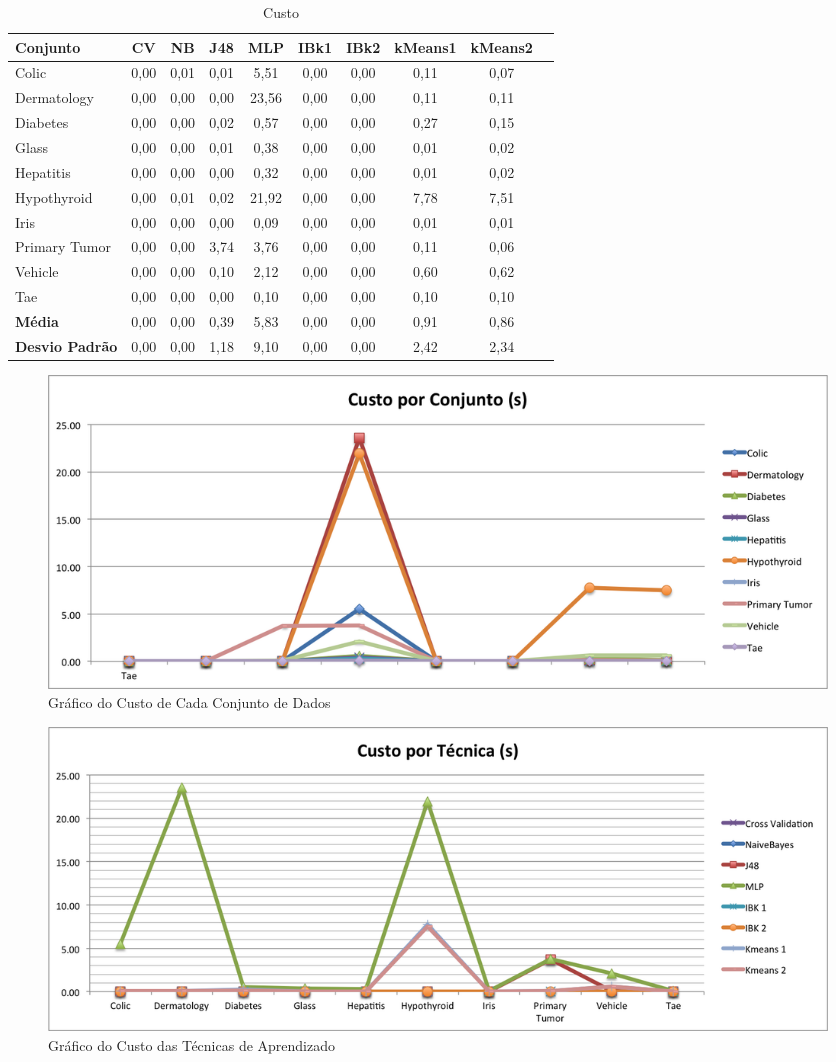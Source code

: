 \documentclass[12pt]{article}
\begin{document}
\begin{table}[h]
	\centering
	\caption{Custo }
	\label{tabelaCustoConjuntoDados}
	\begin{tabular}{lccccccccc}
		\hline
		Conjunto & CV & NB & J48 & MLP & IBk1 & IBk2 & kMeans1 & kMeans2 \\ \hline
		Colic  & 0,00 & 0,01 & 0,01 & 5,51 & 0,00 & 0,00 & 0,11 & 0,07 \\ \hline
		Dermatology & 0,00 & 0,00 & 0,00 & 23,56 & 0,00 & 0,00 & 0,11 & 0,11 \\ \hline
		Diabetes & 0,00 & 0,00 & 0,02 & 0,57 & 0,00 & 0,00 & 0,27 & 0,15 \\ \hline
		Glass & 0,00 & 0,00 & 0,01 & 0,38 & 0,00 & 0,00 & 0,01 & 0,02 \\ \hline
		Hepatitis & 0,00 & 0,00 & 0,00 & 0,32 & 0,00 & 0,00 & 0,01 & 0,02 \\ \hline
		Hypothyroid  & 0,00 & 0,01 & 0,02 & 21,92 & 0,00 & 0,00 & 7,78 & 7,51 \\ \hline
		Iris & 0,00 & 0,00 & 0,00 & 0,09 & 0,00 & 0,00 & 0,01 & 0,01 \\ \hline
		Primary Tumor & 0,00 & 0,00 & 3,74 & 3,76 & 0,00 & 0,00 & 0,11 & 0,06 \\ \hline
		Vehicle & 0,00 & 0,00 & 0,10 & 2,12 & 0,00 & 0,00 & 0,60 & 0,62 \\ \hline
		Tae & 0,00 & 0,00 & 0,00 & 0,10 & 0,00 & 0,00 & 0,10 & 0,10 \\ \hline
		\textbf{Média} & 0,00 & 0,00 & 0,39 & 5,83 & 0,00 & 0,00 & 0,91 & 0,86 \\ \hline
		\textbf{Desvio Padrão} & 0,00 & 0,00 & 1,18 & 9,10 & 0,00 & 0,00 & 2,42 & 2,34 \\ \hline
	\end{tabular}
\end{table}


\begin{figure}[!h]
\centering
\includegraphics[width=.68\textwidth]{CustoConjunto.png}
\caption{Gráfico do Custo de Cada Conjunto de Dados}
\label{fig:custoconjunto}
\end{figure}

\begin{figure}[!h]
\centering
\includegraphics[width=.68\textwidth]{CustoTecnica.png}
\caption{Gráfico do Custo das Técnicas de Aprendizado}
\label{fig:custotecnica}
\end{figure}
\end{document}
